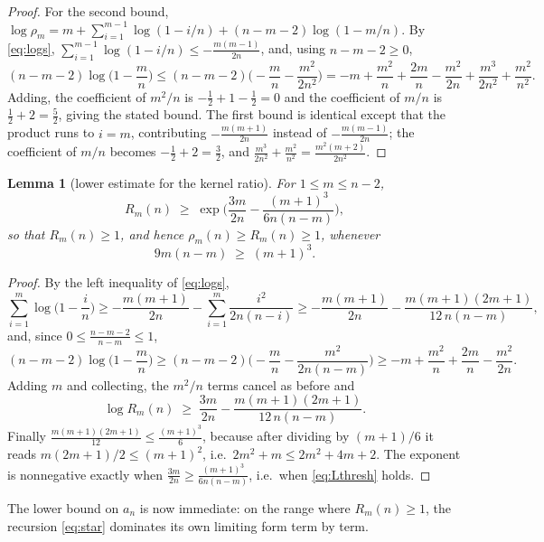 \documentclass[11pt,a4paper]{amsart}
\theoremstyle{plain}
\newtheorem{lemma}[theorem]{Lemma}
\theoremstyle{definition}
\begin{document}
\begin{proof}
For the second bound, $\log\rho_m = m+\sum_{i=1}^{m-1}\log(1-i/n)
+(n-m-2)\log(1-m/n)$. By \eqref{eq:logs},
$\sum_{i=1}^{m-1}\log(1-i/n) \le -\frac{m(m-1)}{2n}$, and, using
$n-m-2 \ge 0$,
\[
  (n-m-2)\log\Big(1-\frac{m}{n}\Big)
  \le (n-m-2)\Big(-\frac{m}{n}-\frac{m^2}{2n^2}\Big)
  = -m+\frac{m^2}{n}+\frac{2m}{n}-\frac{m^2}{2n}+\frac{m^3}{2n^2}+\frac{m^2}{n^2}.
\]
Adding, the coefficient of $m^2/n$ is $-\tfrac12+1-\tfrac12 = 0$ and the
coefficient of $m/n$ is $\tfrac12+2 = \tfrac52$, giving the stated bound. The
first bound is identical except that the product runs to $i=m$, contributing
$-\frac{m(m+1)}{2n}$ instead of $-\frac{m(m-1)}{2n}$; the coefficient of $m/n$
becomes $-\tfrac12+2=\tfrac32$, and
$\frac{m^3}{2n^2}+\frac{m^2}{n^2} = \frac{m^2(m+2)}{2n^2}$.
\end{proof}

\begin{lemma}[lower estimate for the kernel ratio]\label{lem:Rlow}
For $1 \le m \le n-2$,
\[
  R_m(n) \;\ge\; \exp\!\Big(\frac{3m}{2n}-\frac{(m+1)^3}{6n(n-m)}\Big),
\]
so that $R_m(n) \ge 1$, and hence $\rho_m(n) \ge R_m(n) \ge 1$, whenever
\begin{equation}\label{eq:Lthresh}
  9m(n-m) \;\ge\; (m+1)^3 .
\end{equation}
\end{lemma}

\begin{proof}
By the left inequality of \eqref{eq:logs},
\[
  \sum_{i=1}^{m}\log\Big(1-\frac{i}{n}\Big)
  \ge -\frac{m(m+1)}{2n}-\sum_{i=1}^{m}\frac{i^2}{2n(n-i)}
  \ge -\frac{m(m+1)}{2n}-\frac{m(m+1)(2m+1)}{12\,n(n-m)},
\]
and, since $0 \le \frac{n-m-2}{n-m}\le 1$,
\[
  (n-m-2)\log\Big(1-\frac{m}{n}\Big)
  \ge (n-m-2)\Big(-\frac{m}{n}-\frac{m^2}{2n(n-m)}\Big)
  \ge -m+\frac{m^2}{n}+\frac{2m}{n}-\frac{m^2}{2n}.
\]
Adding $m$ and collecting, the $m^2/n$ terms cancel as before and
\[
  \log R_m(n) \;\ge\; \frac{3m}{2n}-\frac{m(m+1)(2m+1)}{12\,n(n-m)} .
\]
Finally $\frac{m(m+1)(2m+1)}{12}\le\frac{(m+1)^3}{6}$, because after dividing by
$(m+1)/6$ it reads $m(2m+1)/2 \le (m+1)^2$, i.e.\ $2m^2+m \le 2m^2+4m+2$.
The exponent is nonnegative exactly when $\frac{3m}{2n}\ge\frac{(m+1)^3}{6n(n-m)}$,
i.e.\ when \eqref{eq:Lthresh} holds.
\end{proof}

The lower bound on $a_n$ is now immediate: on the range where $R_m(n)\ge1$, the
recursion \eqref{eq:star} dominates its own limiting form term by term.
\end{document}
